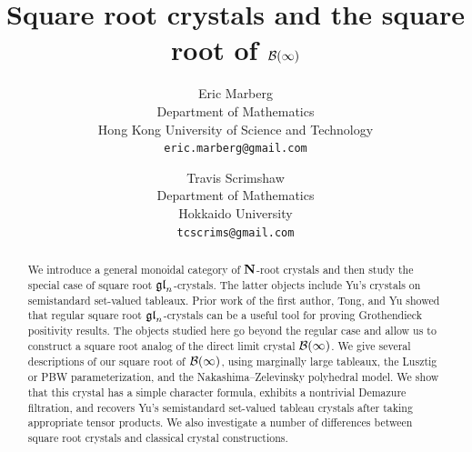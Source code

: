 \documentclass[11pt]{article}
\begin{document}
\title{Square root crystals and the square root of $\mathcal{B}(\infty)$}
\author{
Eric Marberg \\ Department of Mathematics \\  Hong Kong University of Science and Technology \\ {\tt eric.marberg@gmail.com}
\and 
Travis Scrimshaw \\ Department of Mathematics \\ Hokkaido University \\ {\tt tcscrims@gmail.com}
}


\date{}

\makeatletter
\newcommand{\subjclass}[2][1991]{%
  \let\@oldtitle\@title%
  \gdef\@title{\@oldtitle\footnotetext{#1 \emph{Mathematics subject classification:} #2}}%
}
\newcommand{\keywords}[1]{%
  \let\@@oldtitle\@title%
  \gdef\@title{\@@oldtitle\footnotetext{\emph{Key words and phrases:} #1.}}%
}
\makeatother

\subjclass[2020]{05E05, 17B37, 05A19, 14M15}

\keywords{square root crystal, Grothendieck polynomial, set-valued tableau, direct limit crystal}


\maketitle

\begin{abstract}
We introduce a general monoidal category of $\mathbf{N}$-root crystals and then study the special case of square root $\mathfrak{gl}_n$-crystals.
The latter objects include Yu's crystals on semistandard set-valued tableaux.
Prior work of the first author, Tong, and Yu showed that regular square root $\mathfrak{gl}_n$-crystals can be a useful tool for proving Grothendieck positivity results.
The objects studied here go beyond the regular case and allow us to construct a square root analog of the direct limit crystal $\mathcal{B}(\infty)$.
We give several descriptions of our square root of $\mathcal{B}(\infty)$, using marginally large tableaux, the Lusztig or PBW parameterization, and the Nakashima--Zelevinsky polyhedral model.
We show that this crystal has a simple character formula, exhibits a nontrivial Demazure filtration, and recovers Yu's semistandard set-valued tableau crystals after taking appropriate tensor products.
We also investigate a number of differences between square root crystals and classical crystal constructions.
\end{abstract}
\end{document}
